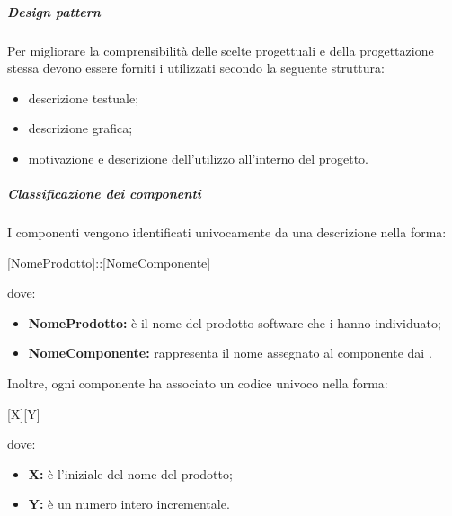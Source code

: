                 \subparagraph{Design pattern}
                Per migliorare la comprensibilità delle scelte progettuali e della progettazione stessa devono essere forniti i  utilizzati secondo la seguente struttura:
	            \begin{itemize}
	            	\item descrizione testuale;
	            	\item descrizione grafica;
	            	\item motivazione e descrizione dell'utilizzo all'interno del progetto.
	            \end{itemize}
            
	            \subparagraph{Classificazione dei componenti}
	            I componenti vengono identificati univocamente da una descrizione nella forma:
	            \begin{center}
					[NomeProdotto]::[NomeComponente]
	            \end{center}
				dove:
				\begin{itemize}
					\item \textbf{NomeProdotto:} è il nome del prodotto software che i \progettisti{} hanno individuato;
					\item \textbf{NomeComponente:} rappresenta il nome assegnato al componente dai \progettisti.
				\end{itemize}
				Inoltre, ogni componente ha associato un codice univoco nella forma:
				\begin{center}
				[X][Y]
				\end{center}
				dove:
				\begin{itemize}
					\item \textbf{X:} è l'iniziale del nome del prodotto; 
					\item \textbf{Y:} è un numero intero incrementale.
				\end{itemize}
			
